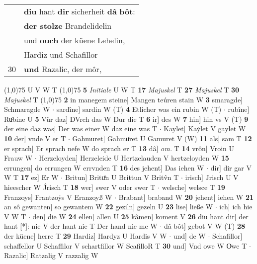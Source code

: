 \documentclass[8pt,a4paper,notitlepage]{article}
\begin{document}
\begin{table}[ht]
\begin{minipage}[t]{0.5\linewidth}
\begin{tabular}{rl}
 & \textbf{diu} hant \textbf{dir} sicherheit \textbf{dâ} \textbf{bôt}:\\ 
 & \textbf{der stolze} Brandelidelin\\ 
 & und \textbf{ouch} der küene Lehelin,\\ 
 & Hardiz und Schafillor\\ 
30 & \textbf{und} Razalic, der môr,\\ 
\end{tabular}
\scriptsize
\line(1,0){75} \newline
U V W T \newline
\line(1,0){75} \newline
\textbf{5} \textit{Initiale} U W T  \textbf{17} \textit{Majuskel} T  \textbf{27} \textit{Majuskel} T  \textbf{30} \textit{Majuskel} T  \newline
\line(1,0){75} \newline
\textbf{2} in manegem steine] Mangen teúren stain W \textbf{3} smaragde] Schmaragde W  $\cdot$ sardîne] sardin W (T) \textbf{4} Etlicher was ein rubin W (T)  $\cdot$ rubîne] Ruͦbine U \textbf{5} Vür daz] DVrch das W Dur die T \textbf{6} ir] des W \textbf{7} hin] hin vs V (T) \textbf{9} der eine daz was] Der was einer W daz eine was T  $\cdot$ Kaylet] Kaẏlet V gaylet W \textbf{10} der] vnde V er T  $\cdot$ Gahmuret] Gahmuͦret U Gamuret V (W) \textbf{11} als] sam T \textbf{12} er sprach] Er sprach nefe W do sprach er T \textbf{13} dâ] \textit{om.} T \textbf{14} vrôn] Vroin U Frauw W  $\cdot$ Herzeloyden] Herzeleide U Hertzelauden V hertzeloyden W \textbf{15} errungen] do errungen W errvnden T \textbf{16} des jehent] Das iehen W  $\cdot$ dir] dir gar V W T \textbf{17} ez] Er W  $\cdot$ Britun] Brituͦn U Brittun V Britv̂n T  $\cdot$ irisch] Jrisch U V hieescher W Ĵrisch T \textbf{18} wer] swer V oder swer T  $\cdot$ welsche] welsce T \textbf{19} Franzoys] Frantzoẏs V Eranzoyß W  $\cdot$ Brabant] braband W \textbf{20} jehent] iehen W \textbf{21} an sô gewanten] so gewantem W \textbf{22} geziln] gezeln U \textbf{23} lise] ließe W  $\cdot$ ich] ich hie V W T  $\cdot$ den] die W \textbf{24} ellen] allen U \textbf{25} kâmen] koment V \textbf{26} diu hant dir] der hant [*]: nie V der hant nie T Der hand nie me W  $\cdot$ dâ bôt] gebot V W (T) \textbf{28} der küene] herre T \textbf{29} Hardiz] Hardyz U Hardis V W  $\cdot$ und] de W  $\cdot$ Schafillor] schaffellor U Schaffilor V schartfillor W ScafilloR T \textbf{30} und] Vnd owe W Oͮwe T  $\cdot$ Razalic] Ratzalig V razzalig W \newline
\end{minipage}
\end{table}
\end{document}
